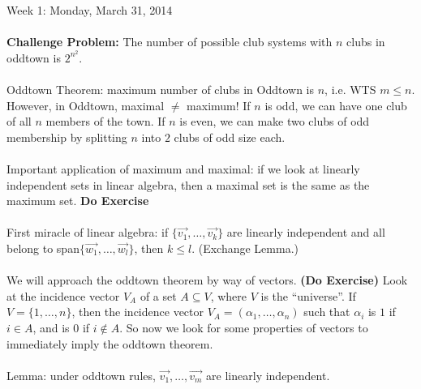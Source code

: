 \documentclass[12pt]{article}
\theoremstyle{remark}
\newcommand*\w[1]{\overrightarrow{#1}}
\begin{document}
\begin{section}{Week 1: Monday, March 31, 2014}
\\\\\textbf{Challenge Problem:} The number of possible club systems with $n$ clubs in oddtown is $2^{n^2}$.
\\\\Oddtown Theorem: maximum number of clubs in Oddtown is $n$, i.e. WTS $m \leq n$. However, in Oddtown, maximal $\neq$ maximum! If $n$ is odd, we can have one club of all $n$ members of the town. If $n$ is even, we can make two clubs of odd membership by splitting $n$ into $2$ clubs of odd size each.
\\\\Important application of maximum and maximal: if we look at linearly independent sets in linear algebra, then a maximal set is the same as the maximum set. \textbf{Do Exercise}
\\\\First miracle of linear algebra: if $\{\w{v_1},\ldots,\w{v_k}\}$ are linearly independent and all belong to span$\{\w{w_1},\ldots,\w{w_l}\}$, then $k \leq l$. (Exchange Lemma.)
\\\\We will approach the oddtown theorem by way of vectors. \textbf{(Do Exercise)} Look at the incidence vector $V_A$ of a set $A \subseteq V$, where $V$ is the ``universe''. If $V = \{1,\ldots,n\}$, then the incidence vector $V_A = (\alpha_1,\ldots,\alpha_n)$ such that $\alpha_i$ is $1$ if $i \in A$, and is $0$ if $i \notin A$. So now we look for some properties of vectors to immediately imply the oddtown theorem. 
\\\\Lemma: under oddtown rules, $\w{v_1},\ldots,\w{v_m}$ are linearly independent.
\end{section}
\newpage
\end{document}
